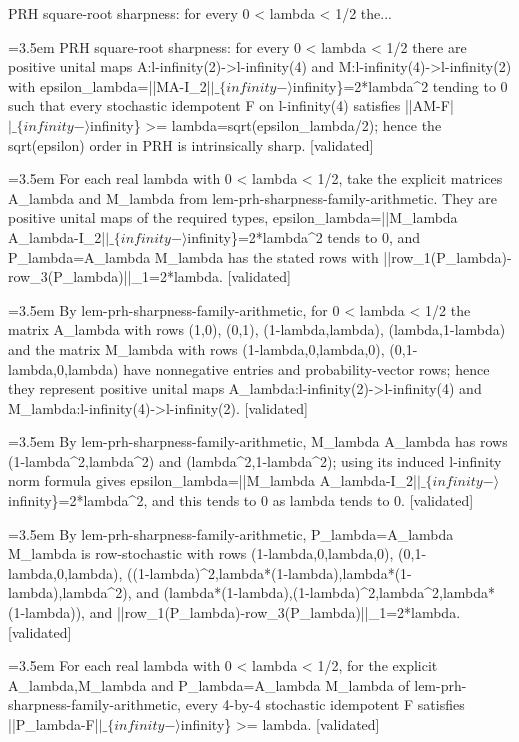 \documentclass{article}
\newcommand{\step}[1]{\par\noindent\hangindent=3.5em\hangafter=1%
  \makebox[3.5em][l]{\textbf{#1.}}}
\newcommand{\steptag}[1]{\hfill{\small\textsf{[#1]}}}
\begin{document}
\begin{proofbox}{PRH square-root sharpness: for every 0 < lambda < 1/2 the...}
\step{1} PRH square-root sharpness: for every 0 < lambda < 1/2 there are positive unital maps A:l-infinity(2)->l-infinity(4) and M:l-infinity(4)->l-infinity(2) with epsilon\_lambda=||MA-I\_2|$|\_\{infinity-\rangle$infinity\}=2*lambda\textasciicircum{}2 tending to 0 such that every stochastic idempotent F on l-infinity(4) satisfies ||AM-F|$|\_\{infinity-\rangle$infinity\} >= lambda=sqrt(epsilon\_lambda/2); hence the sqrt(epsilon) order in PRH is intrinsically sharp. \steptag{validated} \\[6pt]
\step{1.1} For each real lambda with 0 < lambda < 1/2, take the explicit matrices A\_lambda and M\_lambda from lem-prh-sharpness-family-arithmetic. They are positive unital maps of the required types, epsilon\_lambda=||M\_lambda A\_lambda-I\_2|$|\_\{infinity-\rangle$infinity\}=2*lambda\textasciicircum{}2 tends to 0, and P\_lambda=A\_lambda M\_lambda has the stated rows with ||row\_1(P\_lambda)-row\_3(P\_lambda)||\_1=2*lambda. \steptag{validated} \\[6pt]
\step{1.1.1} By lem-prh-sharpness-family-arithmetic, for 0 < lambda < 1/2 the matrix A\_lambda with rows (1,0), (0,1), (1-lambda,lambda), (lambda,1-lambda) and the matrix M\_lambda with rows (1-lambda,0,lambda,0), (0,1-lambda,0,lambda) have nonnegative entries and probability-vector rows; hence they represent positive unital maps A\_lambda:l-infinity(2)->l-infinity(4) and M\_lambda:l-infinity(4)->l-infinity(2). \steptag{validated} \\[4pt]
\step{1.1.2} By lem-prh-sharpness-family-arithmetic, M\_lambda A\_lambda has rows (1-lambda\textasciicircum{}2,lambda\textasciicircum{}2) and (lambda\textasciicircum{}2,1-lambda\textasciicircum{}2); using its induced l-infinity norm formula gives epsilon\_lambda=||M\_lambda A\_lambda-I\_2|$|\_\{infinity-\rangle$infinity\}=2*lambda\textasciicircum{}2, and this tends to 0 as lambda tends to 0. \steptag{validated} \\[4pt]
\step{1.1.3} By lem-prh-sharpness-family-arithmetic, P\_lambda=A\_lambda M\_lambda is row-stochastic with rows (1-lambda,0,lambda,0), (0,1-lambda,0,lambda), ((1-lambda)\textasciicircum{}2,lambda*(1-lambda),lambda*(1-lambda),lambda\textasciicircum{}2), and (lambda*(1-lambda),(1-lambda)\textasciicircum{}2,lambda\textasciicircum{}2,lambda*(1-lambda)), and ||row\_1(P\_lambda)-row\_3(P\_lambda)||\_1=2*lambda. \steptag{validated} \\[4pt]
\step{1.2} For each real lambda with 0 < lambda < 1/2, for the explicit A\_lambda,M\_lambda and P\_lambda=A\_lambda M\_lambda of lem-prh-sharpness-family-arithmetic, every 4-by-4 stochastic idempotent F satisfies ||P\_lambda-F|$|\_\{infinity-\rangle$infinity\} >= lambda. \steptag{validated} \\[6pt]

\end{proofbox}
\end{document}
